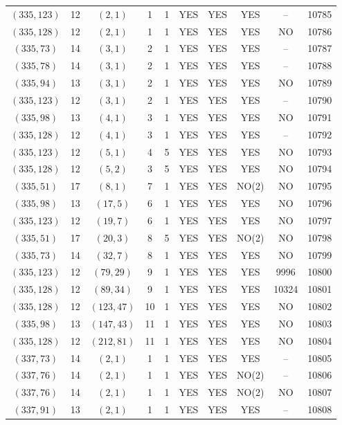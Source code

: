 \begin{longtable}{|c|c|c|c|c|c|c|c|c|c|}
$(335, 123)$ & 12 & $(2, 1)$ & 1 & 1 & YES & YES & YES & -- & 10785\\
$(335, 128)$ & 12 & $(2, 1)$ & 1 & 1 & YES & YES & YES & NO & 10786\\
$(335, 73)$ & 14 & $(3, 1)$ & 2 & 1 & YES & YES & YES & -- & 10787\\
$(335, 78)$ & 14 & $(3, 1)$ & 2 & 1 & YES & YES & YES & -- & 10788\\
$(335, 94)$ & 13 & $(3, 1)$ & 2 & 1 & YES & YES & YES & NO & 10789\\
$(335, 123)$ & 12 & $(3, 1)$ & 2 & 1 & YES & YES & YES & -- & 10790\\
$(335, 98)$ & 13 & $(4, 1)$ & 3 & 1 & YES & YES & YES & NO & 10791\\
$(335, 128)$ & 12 & $(4, 1)$ & 3 & 1 & YES & YES & YES & -- & 10792\\
$(335, 123)$ & 12 & $(5, 1)$ & 4 & 5 & YES & YES & YES & NO & 10793\\
$(335, 128)$ & 12 & $(5, 2)$ & 3 & 5 & YES & YES & YES & NO & 10794\\
$(335, 51)$ & 17 & $(8, 1)$ & 7 & 1 & YES & YES & NO(2) & NO & 10795\\
$(335, 98)$ & 13 & $(17, 5)$ & 6 & 1 & YES & YES & YES & NO & 10796\\
$(335, 123)$ & 12 & $(19, 7)$ & 6 & 1 & YES & YES & YES & NO & 10797\\
$(335, 51)$ & 17 & $(20, 3)$ & 8 & 5 & YES & YES & NO(2) & NO & 10798\\
$(335, 73)$ & 14 & $(32, 7)$ & 8 & 1 & YES & YES & YES & NO & 10799\\
$(335, 123)$ & 12 & $(79, 29)$ & 9 & 1 & YES & YES & YES & 9996 & 10800\\
$(335, 128)$ & 12 & $(89, 34)$ & 9 & 1 & YES & YES & YES & 10324 & 10801\\
$(335, 128)$ & 12 & $(123, 47)$ & 10 & 1 & YES & YES & YES & NO & 10802\\
$(335, 98)$ & 13 & $(147, 43)$ & 11 & 1 & YES & YES & YES & NO & 10803\\
$(335, 128)$ & 12 & $(212, 81)$ & 11 & 1 & YES & YES & YES & NO & 10804\\
$(337, 73)$ & 14 & $(2, 1)$ & 1 & 1 & YES & YES & YES & -- & 10805\\
$(337, 76)$ & 14 & $(2, 1)$ & 1 & 1 & YES & YES & NO(2) & -- & 10806\\
$(337, 76)$ & 14 & $(2, 1)$ & 1 & 1 & YES & YES & NO(2) & NO & 10807\\
$(337, 91)$ & 13 & $(2, 1)$ & 1 & 1 & YES & YES & YES & -- & 10808\\

\end{longtable}
